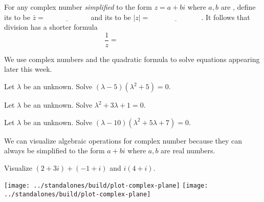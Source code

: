 \documentclass[../main.tex]{subfiles}
\begin{document}
For any complex number \emph{simplified} to the form \(z = a + bi\) where \(a,b\) are \underline{\hspace{3cm}}, define its  to be \(\bar{z} = \underline{\hspace{1in}}\) and its  to be \(|z| = \underline{\hspace{3cm}}\).  It follows that division has a shorter formula
\[
  \frac{1}{z} = \hspace{1in}
\]

\faStar{} We use complex numbers and the quadratic formula to solve equations appearing later this week.
\begin{example}
  Let \(\lambda\) be an unknown. Solve \((\lambda - 5) (\lambda^{2} + 5) = 0\).
\end{example}

\begin{example}
  Let \(\lambda\) be an unknown. Solve \(\lambda^{2} + 3\lambda + 1 = 0\).
\end{example}

\begin{example}
  Let \(\lambda\) be an unknown. Solve \((\lambda - 10) (\lambda^{2} + 5\lambda + 7) = 0\).
\end{example}

We can visualize algebraic operations for complex number because they can always be simplified to the form \(a + bi\) where \(a,b\) are real numbers.

\begin{example}
  Visualize \((2 + 3i) + (-1 + i)\) and \(i (4 + i)\).

  \begin{center}
  \texttt{[image: ../standalones/build/plot-complex-plane]}
  \quad
  \texttt{[image: ../standalones/build/plot-complex-plane]}
  \end{center}
\end{example}
\end{document}

